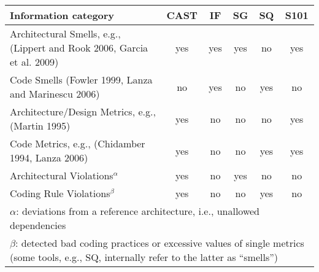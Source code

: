 \begin{tabularx}{\linewidth}{X|c|c|c|c|c}
\toprule
\multicolumn{1}{l|}{Information category}		
& CAST	
& IF 	
& SG 	 	
& SQ
& S101\\
\midrule
Architectural Smells, e.g., (Lippert and Rook 2006, Garcia et al. 2009)		& yes			& yes	& yes	& no	& yes\\
Code Smells (Fowler 1999, Lanza and Marinescu 2006) 				& no			& yes	& no	& yes	& no\\
\midrule
Architecture/Design Metrics, e.g., (Martin 1995) 			& yes			& no	& no	& no	& yes\\
Code Metrics, e.g., (Chidamber 1994, Lanza 2006)				& yes   		& no    & no    & yes	& yes\\
\midrule
Architectural Violations$^\alpha$	& yes			& no	& yes	& no	& no\\
Coding Rule Violations$^\beta$		& yes   		& no	& no	& yes	& no\\
 \midrule
\multicolumn{6}{p{.99\linewidth}}{\footnotesize
$\alpha$: deviations from a reference architecture, i.e., unallowed dependencies}\\
\multicolumn{6}{p{.99\linewidth}}{\footnotesize
$\beta$: detected bad coding practices or excessive values of single metrics (some tools, e.g., SQ, internally refer to the latter as ``smells'')}\\
\bottomrule 
\end{tabularx}%
